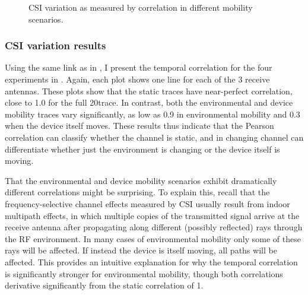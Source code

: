 \begin{figure}[htb]
	\hspace{0.06\textwidth}%
	\caption{\label{fig:mobility_csi}CSI variation as measured by correlation in different mobility scenarios.}
\end{figure}

\subsubsection{CSI variation results}
Using the same link as in , I present the temporal correlation for the four experiments in . Again, each plot shows one line for each of the 3 receive antennas. These plots show that the static traces have near-perfect correlation, close to 1.0 for the full 20\s trace.  In contrast, both the environmental and device mobility traces vary significantly, as low as 0.9 in environmental mobility and 0.3 when the device itself moves. These results thus indicate that the Pearson correlation can classify whether the channel is static, and in changing channel can differentiate whether just the environment is changing or the device itself is moving.

That the environmental and device mobility scenarios exhibit dramatically different correlations might be surprising. To explain this, recall that the frequency-selective channel effects measured by CSI usually result from indoor multipath effects, in which multiple copies of the transmitted signal arrive at the receive antenna after propagating along different (possibly reflected) rays through the RF environment. In many cases of environmental mobility only some of these rays will be affected. If instead the device is itself moving, all paths will be affected. This provides an intuitive explanation for why the temporal correlation is significantly stronger for environmental mobility, though both correlations derivative significantly from the static correlation of 1.


